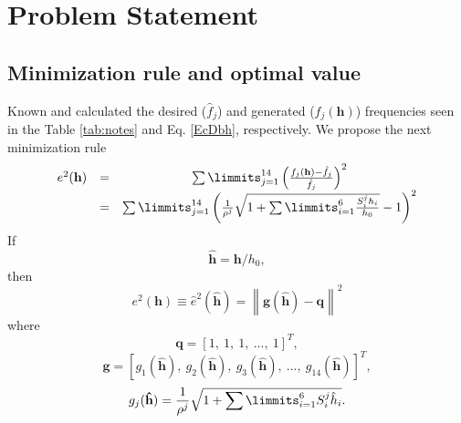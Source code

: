 \documentclass[11pt,twocolumn]{article}
\begin{document}

\section{Problem Statement}



\subsection{Minimization rule and optimal value}
Known and calculated the desired ($\hat{f}_j$) and generated ($f_j(\mathbf{h})$) frequencies 
seen in the Table \ref{tab:notes}  and Eq. \ref{EcDbh}, respectively.
We propose the next minimization rule
\begin{equation}
\label{eq:minimization}
\begin{matrix}
e^2(\mathbf{h}) & = & \sum\limmits_{j=1}^{14}\left(\frac{f_{j}(\mathbf{h})-\hat{f}_{j}}{\hat{f}_{j}}\right)^2\\
~ & = & \sum\limmits_{j=1}^{14}\left(\frac{1}{\rho^j}\sqrt{1+\sum\limmits_{i=1}^{6} \frac{S_{i}^{j} h_i}{h_0}}-1\right)^2
\end{matrix}
\end{equation}
If 
\begin{equation}\label{eq:varchange}
\mathbf{\hat{h}}=\mathbf{h}/h_0,
\end{equation}
then
\begin{equation}
e^2(\mathbf{h}) \equiv \hat{e}^2(\mathbf{\hat{h}}) = \left\|\mathbf{g}(\mathbf{\hat{h}})-\mathbf{q}\right\|^2
\end{equation}
where
\begin{equation}
\mathbf{q}=[1,~1,~1,~...,~1]^T,
\end{equation}
\begin{equation}
\mathbf{g}=[g_1(\mathbf{\hat{h}}),~g_2(\mathbf{\hat{h}}),~g_3(\mathbf{\hat{h}}),~...,~g_{14}(\mathbf{\hat{h}})]^T,
\end{equation}
\begin{equation}
g_j (\mathbf{\hat{h}})=\frac{1}{\rho^j}\sqrt{1+\sum\limmits_{i=1}^{6} S_{i}^{j} \hat{h}_i}.
\end{equation}
\end{document}
